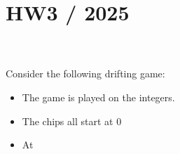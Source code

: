 \documentclass[12pt]{article}
\begin{document}
 
 
\section{HW3 / 2025}

~\\~\\

Consider the following drifting game:
\begin{itemize}
\item The game is played on the integers.
\item The chips all start at 0
  \item At 
  \end{itemize}
\end{document}
